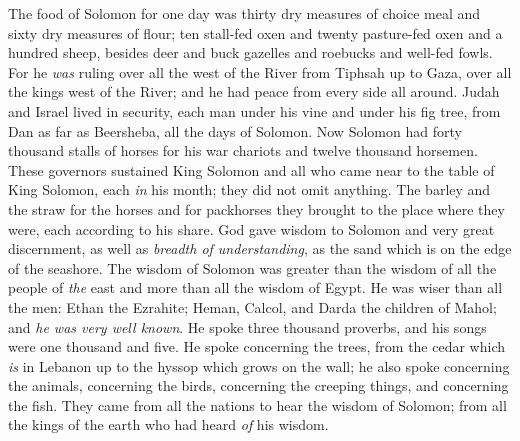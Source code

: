 \begin{biblechapter}
\verse The food of Solomon for one day was thirty dry measures of choice meal and sixty dry measures of flour;
\verse ten stall-fed oxen and twenty pasture-fed oxen and a hundred sheep, besides deer and buck gazelles and roebucks and well-fed fowls.
\verse For he \textit{was} ruling over all the west of the River from Tiphsah up to Gaza, over all the kings west of the River; and he had peace from every side all around.
\verse Judah and Israel lived in security, each man under his vine and under his fig tree, from Dan as far as Beersheba, all the days of Solomon.
\verse Now Solomon had forty thousand stalls of horses for his war chariots and twelve thousand horsemen.
\verse These governors sustained King Solomon and all who came near to the table of King Solomon, each \textit{in} his month; they did not omit anything.
\verse The barley and the straw for the horses and for packhorses they brought to the place where they were, each according to his share.
 God gave wisdom to Solomon and very great discernment, as well as \textit{breadth of understanding}, as the sand which is on the edge of the seashore.
\verse The wisdom of Solomon was greater than the wisdom of all the people of \textit{the} east and more than all the wisdom of Egypt.
\verse He was wiser than all the men: Ethan the Ezrahite; Heman, Calcol, and Darda the children of Mahol; and \textit{he was very well known}.
\verse He spoke three thousand proverbs, and his songs were one thousand and five.
\verse He spoke concerning the trees, from the cedar which \textit{is} in Lebanon up to the hyssop which grows on the wall; he also spoke concerning the animals, concerning the birds, concerning the creeping things, and concerning the fish.
\verse They came from all the nations to hear the wisdom of Solomon; from all the kings of the earth who had heard \textit{of} his wisdom.
\end{biblechapter}

